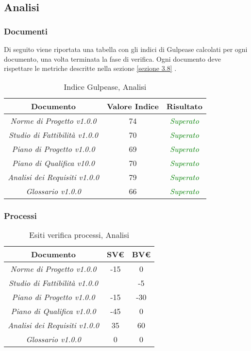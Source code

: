 \subsection{Analisi}
\subsubsection{Documenti}
\label{appendice 1}

Di seguito viene riportata una tabella con gli indici di Gulpease calcolati per ogni documento, una volta terminata la fase di verifica. Ogni documento deve rispettare le metriche descritte nella sezione \ref{sezione 3.8} .\\

\hspace{1cm}

\begin{table}[h]
	\begin{tabular}{|c|c|c|}
		\hline 
		\textbf{Documento} & \textbf{Valore Indice} & \textbf{Risultato} \\ 
		\hline
		\textit{Norme di Progetto v1.0.0} & 74 & \textcolor{green}{\textit{Superato}} \\ 
		\textit{Studio di Fattibilità v1.0.0} & 70 & \textcolor{green}{\textit{Superato}} \\ 
		\textit{Piano di Progetto v1.0.0} & 69 & \textcolor{green}{\textit{Superato}} \\ 
		\textit{Piano di Qualifica v10.0} & 70 & \textcolor{green}{\textit{Superato}} \\ 
		\textit{Analisi dei Requisiti v1.0.0} & 79 & \textcolor{green}{\textit{Superato}} \\ 
		\textit{Glossario v1.0.0} & 66 & \textcolor{green}{\textit{Superato}} \\ 
		\hline 
	\end{tabular}
\caption{Indice Gulpease, Analisi}
\end{table}


\subsubsection{Processi}
\label{appendice 2}
\vspace{3mm}

\begin{table}[h]
	\begin{tabular}{|c|c|c|}
		\toprule
			\textbf{Documento} & \textbf{SV\euro} & \textbf{BV\euro} \\ 
		\midrule
		\midrule
			\textit{Norme di Progetto v1.0.0} & -15 & 0 \\ 
			\textit{Studio di Fattibilità v1.0.0} & & -5 \\ 
			\textit{Piano di Progetto v1.0.0} & -15 & -30 \\ 
			\textit{Piano di Qualifica v1.0.0} & -45 & 0 \\ 
			\textit{Analisi dei Requisiti v1.0.0} & 35 & 60 \\ 
			\textit{Glossario v1.0.0} & 0 & 0 \\ 
		\bottomrule
	\end{tabular}
	\caption{Esiti verifica processi, Analisi}
\end{table}

